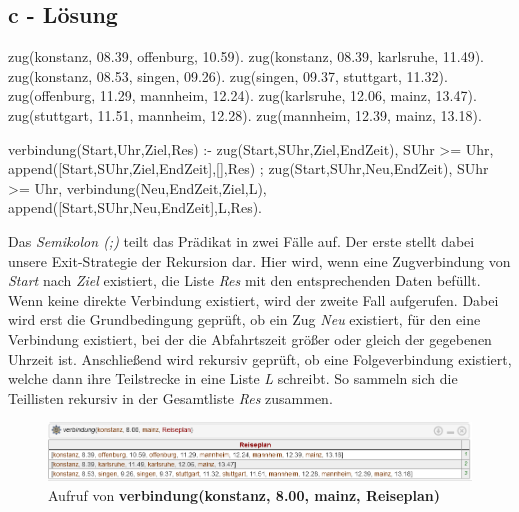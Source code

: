 \subsection*{c - Lösung}
\newline
\begin{code}[language=prolog, caption={Verbindung}, label={lst:Aufgabe5c}]
zug(konstanz, 08.39, offenburg, 10.59).
zug(konstanz, 08.39, karlsruhe, 11.49).
zug(konstanz, 08.53, singen, 09.26).
zug(singen, 09.37, stuttgart, 11.32).
zug(offenburg, 11.29, mannheim, 12.24).
zug(karlsruhe, 12.06, mainz, 13.47).
zug(stuttgart, 11.51, mannheim, 12.28).
zug(mannheim, 12.39, mainz, 13.18).

verbindung(Start,Uhr,Ziel,Res) :-
    zug(Start,SUhr,Ziel,EndZeit),
    SUhr >= Uhr,
    append([Start,SUhr,Ziel,EndZeit],[],Res)
    ;
    zug(Start,SUhr,Neu,EndZeit),
    SUhr >= Uhr,
    verbindung(Neu,EndZeit,Ziel,L),
    append([Start,SUhr,Neu,EndZeit],L,Res).
\end{code}
\newline
Das \textit{Semikolon (;)} teilt das Prädikat in zwei Fälle auf.
Der erste stellt dabei unsere Exit-Strategie der Rekursion dar.
Hier wird, wenn eine Zugverbindung von \textit{Start} nach \textit{Ziel} existiert, die Liste \textit{Res} mit den entsprechenden
Daten befüllt.
\newline
Wenn keine direkte Verbindung existiert, wird der zweite Fall aufgerufen.
Dabei wird erst die Grundbedingung geprüft, ob ein Zug \textit{Neu} existiert, für den eine Verbindung existiert, bei der
die Abfahrtszeit größer oder gleich der gegebenen Uhrzeit ist.
Anschließend wird rekursiv geprüft, ob eine Folgeverbindung existiert, welche dann ihre Teilstrecke in eine Liste \textit{L} schreibt.
So sammeln sich die Teillisten rekursiv in der Gesamtliste \textit{Res} zusammen.
\newline
\begin{figure}[h]
    \centering
	\includegraphics[width=\textwidth]{media/Aufgabe5c_verbindung}
	\caption{Aufruf von \textbf{verbindung(konstanz, 8.00, mainz, Reiseplan)}}
	\label{img:Aufgabe5c_verbindung}
\end{figure}
\newline
